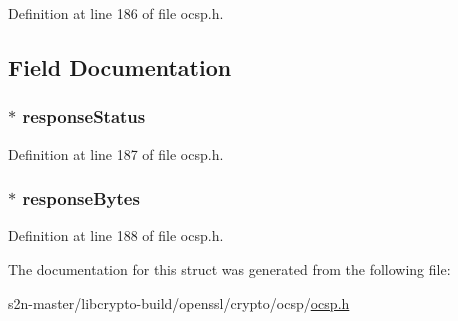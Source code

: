 Definition at line 186 of file ocsp.\+h.



\subsection{Field Documentation}
\subsubsection[{\texorpdfstring{response\+Status}{responseStatus}}]{ $\ast$ response\+Status}\hypertarget{structocsp__response__st_ac6a542c0f43468e58bf47bc6ff99aea8}{}\label{structocsp__response__st_ac6a542c0f43468e58bf47bc6ff99aea8}


Definition at line 187 of file ocsp.\+h.

\subsubsection[{\texorpdfstring{response\+Bytes}{responseBytes}}]{ $\ast$ response\+Bytes}\hypertarget{structocsp__response__st_a26025eb656186d36170480f1c9c782dc}{}\label{structocsp__response__st_a26025eb656186d36170480f1c9c782dc}


Definition at line 188 of file ocsp.\+h.



The documentation for this struct was generated from the following file\+:\begin{DoxyCompactItemize}
\item 
s2n-\/master/libcrypto-\/build/openssl/crypto/ocsp/\hyperlink{crypto_2ocsp_2ocsp_8h}{ocsp.\+h}\end{DoxyCompactItemize}
